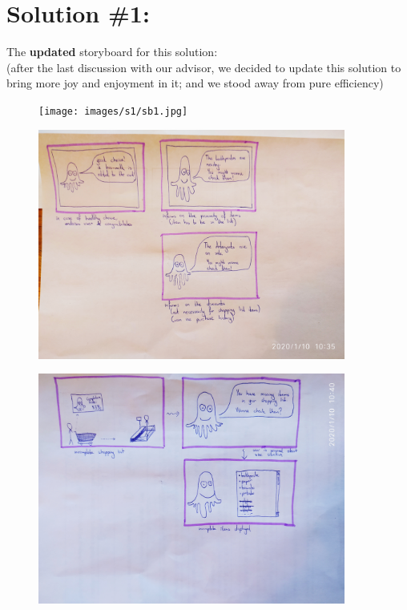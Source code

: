 \section{Solution \#1:}

The \textbf{updated} storyboard for this solution:\\
(after the last discussion with our advisor, we decided to update this solution to bring more joy and enjoyment in it; and we stood away from pure efficiency)

\begin{figure}[H]
	\centering
	\texttt{[image: images/s1/sb1.jpg]}
\end{figure}

\begin{figure}[H]
	\centering
	\includegraphics[trim={0em 25em 0em 0em}, clip, width=0.9\textwidth]{images/s1/sb2.jpg}
\end{figure}

\begin{figure}[H]
	\centering
	\includegraphics[trim={0em 60em 0em 0em}, clip, width=0.9\textwidth]{images/s1/sb3.jpg}
\end{figure}

